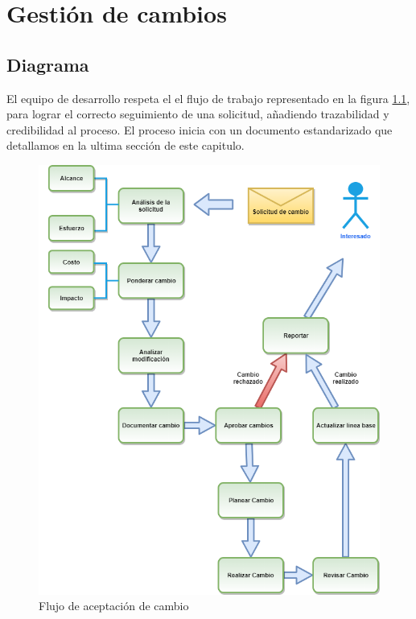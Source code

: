 \chapter{Gestión de cambios}

\section{Diagrama}
El equipo de desarrollo respeta el el flujo de trabajo representado en la figura \ref{fig:gdcambios}, para lograr el correcto seguimiento de una solicitud, añadiendo trazabilidad y credibilidad al proceso.
El proceso inicia con un documento estandarizado que detallamos en la ultima sección de este capitulo.

\begin{figure}[H]
    \centering
    \includegraphics[scale=0.4]{Files/gestCambiosv2.png}
    \caption{Flujo de aceptación de cambio}
    \label{fig:gdcambios}
\end{figure}



